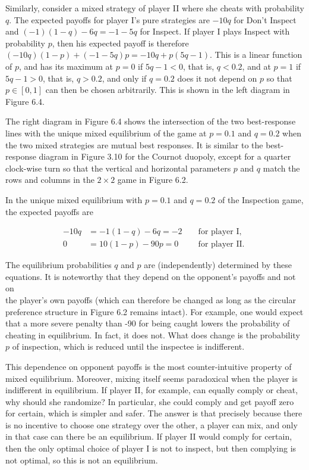 \documentclass[12pt]{article}
\begin{document}
Similarly, consider a mixed strategy of player II where she cheats with probability $q$. The expected payoffs for player I's pure strategies are $-10 q$ for Don't Inspect and $(-1)(1-q)-6 q=-1-5 q$ for Inspect. If player I plays Inspect with probability $p$, then his expected payoff is therefore $(-10 q)(1-p)+(-1-5 q) p=-10 q+p(5 q-1)$. This is a linear function of $p$, and has its maximum at $p=0$ if $5 q-1<0$, that is, $q<0.2$, and at $p=1$ if $5 q-1>0$, that is, $q>0.2$, and only if $q=0.2$ does it not depend on $p$ so that $p \in[0,1]$ can then be chosen arbitrarily. This is shown in the left diagram in Figure 6.4.

The right diagram in Figure 6.4 shows the intersection of the two best-response lines with the unique mixed equilibrium of the game at $p=0.1$ and $q=0.2$ when the two mixed strategies are mutual best responses. It is similar to the best-response diagram in Figure 3.10 for the Cournot duopoly, except for a quarter clock-wise turn so that the vertical and horizontal parameters $p$ and $q$ match the rows and columns in the $2 \times 2$ game in Figure 6.2.

In the unique mixed equilibrium with $p=0.1$ and $q=0.2$ of the Inspection game, the expected payoffs are

$$
\begin{aligned}
-10 q & =-1(1-q)-6 q=-2 & & \text { for player I, } \\
0 & =10(1-p)-90 p=0 & & \text { for player II. }
\end{aligned}
$$

The equilibrium probabilities $q$ and $p$ are (independently) determined by these equations. It is noteworthy that they depend on the opponent's payoffs and not on\\
the player's own payoffs (which can therefore be changed as long as the circular preference structure in Figure 6.2 remains intact). For example, one would expect that a more severe penalty than -90 for being caught lowers the probability of cheating in equilibrium. In fact, it does not. What does change is the probability $p$ of inspection, which is reduced until the inspectee is indifferent.

This dependence on opponent payoffs is the most counter-intuitive property of mixed equilibrium. Moreover, mixing itself seems paradoxical when the player is indifferent in equilibrium. If player II, for example, can equally comply or cheat, why should she randomize? In particular, she could comply and get payoff zero for certain, which is simpler and safer. The answer is that precisely because there is no incentive to choose one strategy over the other, a player can mix, and only in that case can there be an equilibrium. If player II would comply for certain, then the only optimal choice of player I is not to inspect, but then complying is not optimal, so this is not an equilibrium.
\end{document}
